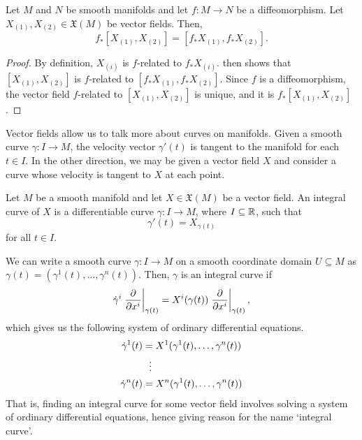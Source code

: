 \documentclass[a4paper,12pt]{article}
\begin{document}
\begin{corollary}\label{cor:pushforward_of_lie_bracket}
    Let $M$ and $N$ be smooth manifolds and let $f \colon M \to N$ be a diffeomorphism.
    Let $X_{(1)}, X_{(2)} \in \mathfrak{X}(M)$ be vector fields.
    Then,
    \begin{equation}
        f_*[X_{(1)}, X_{(2)}] = [f_*X_{(1)}, f_*X_{(2)}].
    \end{equation}
\end{corollary}
\begin{proof}
    By definition, $X_{(i)}$ is $f$-related to $f_*X_{(i)}$.
     then shows that $[X_{(1)}, X_{(2)}]$ is $f$-related to $[f_*X_{(1)}, f_*X_{(2)}]$.
    Since $f$ is a diffeomorphism, the vector field $f$-related to $[X_{(1)}, X_{(2)}]$ is unique, and it is $f_*[X_{(1)}, X_{(2)}]$.
\end{proof}
Vector fields allow us to talk more about curves on manifolds.
Given a smooth curve $\gamma \colon I \to M$, the velocity vector $\gamma'(t)$ is tangent to the manifold for each $t \in I$.
In the other direction, we may be given a vector field $X$ and consider a curve whose velocity is tangent to $X$ at each point.
\begin{definition}\label{def:integral_curve}
    Let $M$ be a smooth manifold and let $X \in \mathfrak{X}(M)$ be a vector field.
    An integral curve of $X$ is a differentiable curve $\gamma \colon I \to M$, where $I \subseteq \mathbb{R}$, such that
    \begin{equation}
        \gamma'(t) = X_{\gamma(t)}
    \end{equation}
    for all $t \in I$.
\end{definition}
We can write a smooth curve $\gamma \colon I \to M$ on a smooth coordinate domain $U \subseteq M$ as $\gamma(t) = (\gamma^1(t), \ldots, \gamma^n(t))$.
Then, $\gamma$ is an integral curve if
\begin{equation}
    \dot{\gamma}^i \eval{\frac{\partial}{\partial x^i}}{\gamma(t)} = X^i(\gamma(t)) \eval{\frac{\partial}{\partial x^i}}{\gamma(t)},
\end{equation}
which gives us the following system of ordinary differential equations.
\begin{align}
    \begin{split}
        \dot{\gamma}^1(t) &= X^1(\gamma^1(t), \ldots, \gamma^n(t)) \\
        \hphantom{\dot{\gamma}^1(t)} & \;\: \vdots \\
        \dot{\gamma}^n(t) &= X^n(\gamma^1(t), \ldots, \gamma^n(t))
    \end{split}
\end{align}
That is, finding an integral curve for some vector field involves solving a system of ordinary differential equations, hence giving reason for the name \enquote*{integral curve}.
\end{document}
